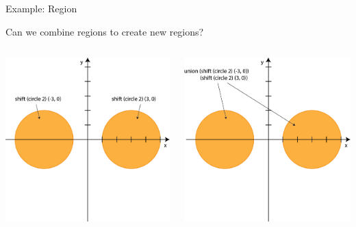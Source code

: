 \documentclass[8pt,aspectratio=169]{beamer}
\begin{document}
\begin{frame}[fragile]{Example: Region}

Can we combine regions to create new regions?

\begin{columns}[onlytextwidth]
\begin{column}{0.5\textwidth}
\pause
\begin{center}
\includegraphics[scale=0.22]{figures/unionRegion1}
\end{center}
\end{column}
\begin{column}{0.5\textwidth}
\pause
\begin{center}
\includegraphics[scale=0.22]{figures/unionRegion2}
\end{center}
\end{column}
\end{columns}


\end{frame}
\end{document}
